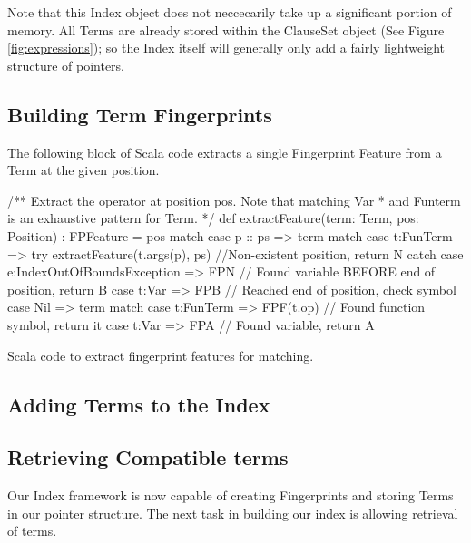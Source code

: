 Note that this Index object does not neccecarily take up a significant portion of memory.
All Terms are already stored within the ClauseSet object (See Figure \ref{fig:expressions});
so the Index itself will generally only add a fairly lightweight structure of pointers.


\subsection{Building Term Fingerprints}

The following block of Scala code extracts a single Fingerprint Feature from
a Term at the given position.
\begin{listing}[H]
\begin{scalacode}
 /** Extract the operator at position pos. Note that matching Var
   * and Funterm is an exhaustive pattern for Term. */
  def extractFeature(term: Term, pos: Position) : FPFeature = pos match {
    case p :: ps => term match {
      case t:FunTerm => try   {extractFeature(t.args(p), ps) }
                        //Non-existent position, return N
                        catch {case e:IndexOutOfBoundsException => FPN}
      // Found variable BEFORE end of position, return B
      case t:Var     => FPB 
    }
    // Reached end of position, check symbol
    case Nil     => term match {
      case t:FunTerm => FPF(t.op) // Found function symbol, return it
      case t:Var     => FPA       // Found variable, return A
    }
  }
\end{scalacode}
\caption{Scala code to extract fingerprint features for matching.}
\label{lst:posextract}
\end{listing} 

\subsection{Adding Terms to the Index}

\subsection{Retrieving Compatible terms}

Our Index framework is now capable of creating Fingerprints and storing Terms in
our pointer structure. The next task in building our index is allowing retrieval
of terms.

